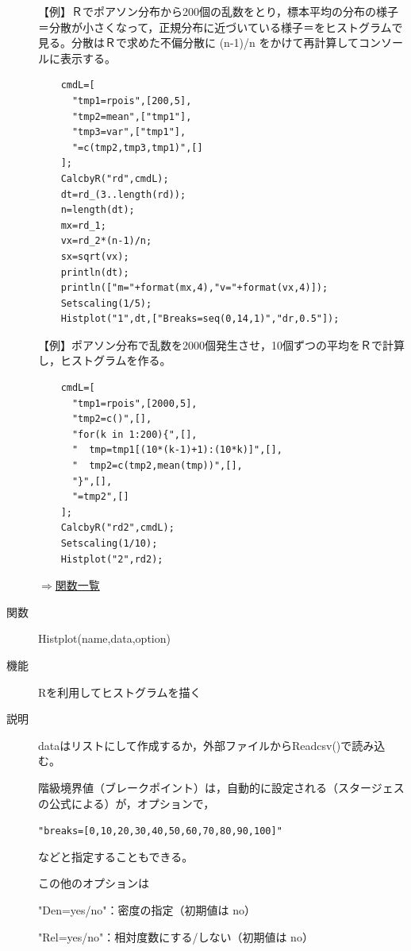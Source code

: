 \documentclass[papersize,a4paper,12pt,uplatex]{jsarticle}
\begin{document}
\begin{description}
\vspace{\baselineskip}
【例】Ｒでポアソン分布から200個の乱数をとり，標本平均の分布の様子＝分散が小さくなって，正規分布に近づいている様子＝をヒストグラムで見る。分散はＲで求めた不偏分散に (n-1)/n をかけて再計算してコンソールに表示する。
\begin{verbatim}
    cmdL=[
      "tmp1=rpois",[200,5],
      "tmp2=mean",["tmp1"],
      "tmp3=var",["tmp1"],
      "=c(tmp2,tmp3,tmp1)",[]
    ];
    CalcbyR("rd",cmdL);
    dt=rd_(3..length(rd));
    n=length(dt);
    mx=rd_1;
    vx=rd_2*(n-1)/n;
    sx=sqrt(vx);
    println(dt);
    println(["m="+format(mx,4),"v="+format(vx,4)]);
    Setscaling(1/5);
    Histplot("1",dt,["Breaks=seq(0,14,1)","dr,0.5"]);
\end{verbatim}
\vspace{\baselineskip}
          \begin{center}  \end{center}
\vspace{\baselineskip}
【例】ポアソン分布で乱数を2000個発生させ，10個ずつの平均をＲで計算し，ヒストグラムを作る。
\begin{verbatim}
    cmdL=[
      "tmp1=rpois",[2000,5],
      "tmp2=c()",[],
      "for(k in 1:200){",[],
      "  tmp=tmp1[(10*(k-1)+1):(10*k)]",[],
      "  tmp2=c(tmp2,mean(tmp))",[],
      "}",[],
      "=tmp2",[]
    ];
    CalcbyR("rd2",cmdL);
    Setscaling(1/10);
    Histplot("2",rd2);
\end{verbatim}

\begin{flushright}  \hyperlink{functionlist}{$\Rightarrow$関数一覧}\end{flushright}
\hypertarget{histplot}{}
\item[関数]  Histplot(name,data,option)
\item[機能]  Rを利用してヒストグラムを描く
\item[説明]  dataはリストにして作成するか，外部ファイルからReadcsv()で読み込む。

階級境界値（ブレークポイント）は，自動的に設定される（スタージェスの公式による）が，オプションで，

\verb|"breaks=[0,10,20,30,40,50,60,70,80,90,100]"|
      
などと指定することもできる。

  この他のオプションは
  
    "Den=yes/no"：密度の指定（初期値は no）
    
    "Rel=yes/no"：相対度数にする/しない（初期値は no）
    

\end{description}
\end{document}
